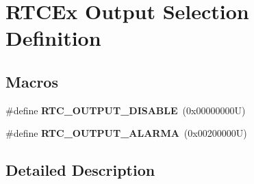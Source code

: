 \hypertarget{group___r_t_c_ex___output__selection___definitions}{}\section{R\+T\+C\+Ex Output Selection Definition}
\label{group___r_t_c_ex___output__selection___definitions}
\subsection*{Macros}
\begin{DoxyCompactItemize}
\item 
\mbox{\label{group___r_t_c_ex___output__selection___definitions_ga2c2347927c96e0db36e16d865a33a5e9}} 
\#define {\bfseries R\+T\+C\+\_\+\+O\+U\+T\+P\+U\+T\+\_\+\+D\+I\+S\+A\+B\+LE}~(0x00000000\+U)
\item 
\mbox{\label{group___r_t_c_ex___output__selection___definitions_gab5decd99536cc483960c47de13d2cdf1}} 
\#define {\bfseries R\+T\+C\+\_\+\+O\+U\+T\+P\+U\+T\+\_\+\+A\+L\+A\+R\+MA}~(0x00200000\+U)
\end{DoxyCompactItemize}


\subsection{Detailed Description}
